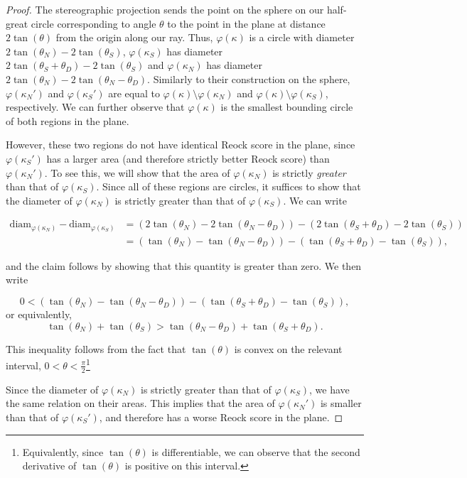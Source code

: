\begin{proof}
  The stereographic projection sends the point on the sphere on our half-great circle corresponding to angle $\theta$ to the point in the plane at distance $2\tan(\theta)$ from the origin along our ray.  Thus, $\varphi(\kappa)$ is a circle with diameter $2\tan(\theta_N)-2\tan(\theta_S)$, $\varphi(\kappa_S)$ has diameter $2\tan(\theta_S+\theta_D)-2\tan(\theta_S)$ and $\varphi(\kappa_N)$ has diameter $2\tan(\theta_N)-2\tan(\theta_N-\theta_D)$.  Similarly to their construction on the sphere, $\varphi(\kappa_N')$ and $\varphi(\kappa_S')$ are equal to $\varphi(\kappa)\setminus \varphi(\kappa_N)$ and $\varphi(\kappa)\setminus \varphi(\kappa_S)$, respectively.  We can further observe that $\varphi(\kappa)$ is the smallest bounding circle of both regions in the plane.
  
  However, these two regions do not have identical Reock score in the plane, since $\varphi(\kappa_S')$ has a larger area (and therefore strictly better Reock score) than $\varphi(\kappa_N')$.  To see this, we will show that the area of $\varphi(\kappa_N)$ is strictly \textit{greater} than that of $\varphi(\kappa_S)$. Since all of these regions are circles, it suffices to show that the diameter of $\varphi(\kappa_N)$ is strictly {greater} than that of $\varphi(\kappa_S)$.  We can write
  
  \begin{align*}
  \mathrm{diam}_{\varphi(\kappa_N)} - \mathrm{diam}_{\varphi(\kappa_S)} &= \left(2\tan(\theta_N) - 2\tan(\theta_N-\theta_D)\right) - \left( 2\tan(\theta_S+\theta_D) - 2\tan(\theta_S) \right)\\
  &= \left(\tan(\theta_N) - \tan(\theta_N-\theta_D)\right) - \left( \tan(\theta_S+\theta_D) - \tan(\theta_S) \right),
  \end{align*}
  
and the claim follows by showing that this quantity is greater than zero.  We then write 

$$0< \left(\tan(\theta_N) - \tan(\theta_N-\theta_D)\right) - \left( \tan(\theta_S+\theta_D) - \tan(\theta_S) \right),$$
 or equivalently,
 $$\tan(\theta_N) + \tan(\theta_S) >   \tan(\theta_N-\theta_D) + \tan(\theta_S+\theta_D). $$

This inequality follows from the fact that $\tan(\theta)$ is convex on the relevant interval, $0<\theta<\tfrac{\pi}{2}$\footnote{Equivalently, since $\tan(\theta)$ is differentiable, we can observe that the second derivative of $\tan(\theta)$ is positive on this interval.}

Since  the diameter of $\varphi(\kappa_N)$ is strictly {greater} than that of $\varphi(\kappa_S)$, we have the same relation on their areas.  This implies that the area of $\varphi(\kappa_N')$ is smaller than that of $\varphi(\kappa_S')$, and therefore has a worse Reock score in the plane. 
   
  
\end{proof}
